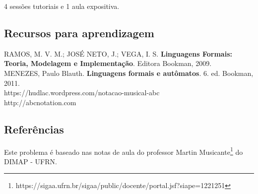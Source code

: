 4 sessões tutoriais e 1 aula expositiva.

\subsection{\large{Recursos para aprendizagem}}

RAMOS, M. V. M.; JOSÉ NETO, J.; VEGA, I. S. \textbf{Linguagens Formais: Teoria, Modelagem e Implementação}. Editora Bookman, 2009.\\

\noindent
MENEZES, Paulo Blauth. \textbf{Linguagens formais e autômatos}. 6. ed. Bookman, 2011.\\

\noindent
https://hudlac.wordpress.com/notacao-musical-abc\\

\noindent
http://abcnotation.com

\subsection*{Referências}

Este problema é baseado nas notas de aula do professor Martin Musicante\footnote{\scriptsize{https://sigaa.ufrn.br/sigaa/public/docente/portal.jsf?siape=1221251}} do DIMAP - UFRN.

